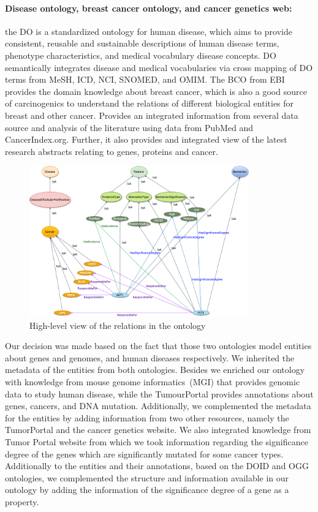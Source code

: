 \paragraph{Disease ontology, breast cancer ontology, and cancer genetics web:} \hspace*{-2.5mm} the DO is a standardized ontology for human disease, which aims to provide consistent, reusable and sustainable descriptions of human disease terms, phenotype characteristics, and medical vocabulary disease concepts. DO semantically integrates disease and medical vocabularies via cross mapping of DO terms from MeSH, ICD, NCI, SNOMED, and OMIM. The BCO from EBI provides the domain knowledge about breast cancer, which is also a good source of carcinogenics to understand the relations of different biological entities for breast and other cancer. Provides an integrated information from several data source and analysis of the literature using data from PubMed and CancerIndex.org. Further, it also provides and integrated view of the latest research abstracts relating to genes, proteins and cancer.  

\begin{figure}
	\centering
	\includegraphics[width=0.8\linewidth,height=65mm]{images/GeneralRelations-Ontology.png}
	\caption{High-level view of the relations in the ontology}
	\label{fig:main_ontology_relations}
	\vspace{-4mm}
\end{figure}

\hspace*{3.5mm} Our decision was made based on the fact that those two ontologies model entities about genes and genomes, and human diseases respectively. We inherited the metadata of the entities from both ontologies. Besides we enriched our ontology with knowledge from mouse genome informatics~(MGI) that provides genomic data to study human disease, while the TumourPortal provides annotations about genes, cancers, and DNA mutation. Additionally, we complemented the metadata for the entities by adding information from two other resources, namely the TumorPortal and the cancer genetics website. We also integrated knowledge from Tumor Portal website from which we took information regarding the significance degree of the genes which are significantly mutated for some cancer types. Additionally to the entities and their annotations, based on the DOID and OGG ontologies, we complemented the structure and information available in our ontology by adding the information of the significance degree of a gene as a property. 

